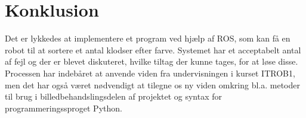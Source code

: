 \clearpage
\section{Konklusion} %
\label{sec:konklusion}

Det er lykkedes at implementere et program ved hjælp af ROS, som kan få en robot til at sortere et antal klodser efter farve. Systemet har et acceptabelt antal af fejl og der er blevet diskuteret, hvilke tiltag der kunne tages, for at løse disse. \\

Processen har indebåret at anvende viden fra undervisningen i kurset ITROB1, men det har også været nødvendigt at tilegne os ny viden omkring bl.a. metoder til brug i billedbehandslingsdelen af projektet og syntax for programmeringssproget Python. \\

